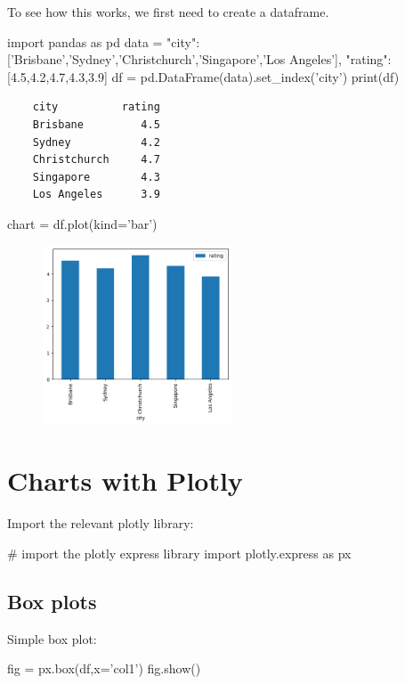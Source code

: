 To see how this works, we first need to create a dataframe.

\begin{pycode}
    import pandas as pd
    data = {"city":['Brisbane','Sydney','Christchurch','Singapore','Los Angeles'],
    "rating":[4.5,4.2,4.7,4.3,3.9]}
    df = pd.DataFrame(data).set_index('city')
    print(df)
\end{pycode}

\begin{verbatim}
    city          rating
    Brisbane         4.5
    Sydney           4.2
    Christchurch     4.7
    Singapore        4.3
    Los Angeles      3.9
\end{verbatim}


\begin{pycode}
    chart = df.plot(kind='bar')
\end{pycode}

\begin{figure}[!h]
    \includegraphics[width=0.5\textwidth]{graphics/simple_bar.png}
\end{figure}

\section{Charts with Plotly}

Import the relevant plotly library:

\begin{pycode}
    # import the plotly express library
    import plotly.express as px
\end{pycode}

\subsection{Box plots}

Simple box plot:

\begin{pycode}
    fig = px.box(df,x='col1')
    fig.show()
\end{pycode}

